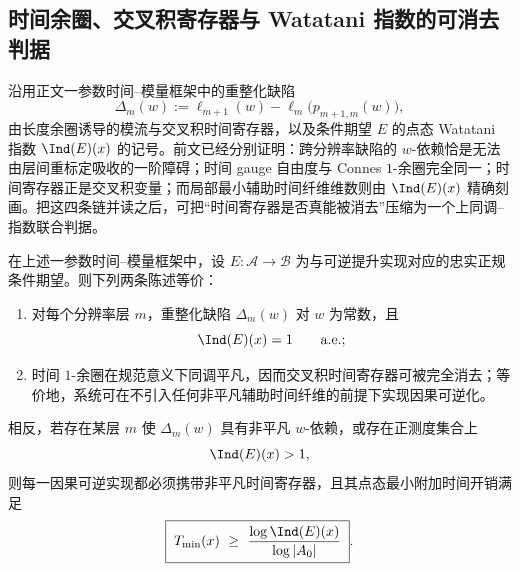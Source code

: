 \subsection{时间余圈、交叉积寄存器与 Watatani 指数的可消去判据}\label{subsec:conclusion-time-cocycle-register-eliminability-index}
沿用正文一参数时间--模量框架中的重整化缺陷
\[
\Delta_m(w):=\ell_{m+1}(w)-\ell_m\!\bigl(p_{m+1,m}(w)\bigr),
\]
由长度余圈诱导的模流与交叉积时间寄存器，以及条件期望 \(E\) 的点态 Watatani 指数 \(\Ind(E)(x)\) 的记号。前文已经分别证明：跨分辨率缺陷的 \(w\)-依赖恰是无法由层间重标定吸收的一阶障碍；时间 gauge 自由度与 Connes \(1\)-余圈完全同一；时间寄存器正是交叉积变量；而局部最小辅助时间纤维维数则由 \(\Ind(E)(x)\) 精确刻画。把这四条链并读之后，可把“时间寄存器是否真能被消去”压缩为一个上同调--指数联合判据。

\begin{theorem}\label{thm:conclusion-time-register-eliminability-cohomology-index-criterion}
在上述一参数时间--模量框架中，设 \(E:\mathcal A\to\mathcal B\) 为与可逆提升实现对应的忠实正规条件期望。则下列两条陈述等价：
\begin{enumerate}
  \item 对每个分辨率层 \(m\)，重整化缺陷 \(\Delta_m(w)\) 对 \(w\) 为常数，且
  \[
  \Ind(E)(x)=1
  \qquad\text{a.e.};
  \]
  \item 时间 \(1\)-余圈在规范意义下同调平凡，因而交叉积时间寄存器可被完全消去；等价地，系统可在不引入任何非平凡辅助时间纤维的前提下实现因果可逆化。
\end{enumerate}

相反，若存在某层 \(m\) 使 \(\Delta_m(w)\) 具有非平凡 \(w\)-依赖，或存在正测度集合上
\[
\Ind(E)(x)>1,
\]
则每一因果可逆实现都必须携带非平凡时间寄存器，且其点态最小附加时间开销满足
\[
\boxed{\;
T_{\min}(x)\ \ge\ \frac{\log \Ind(E)(x)}{\log |A_0|}\; }.
\]
\end{theorem}
